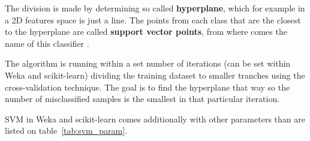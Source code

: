 The division is made by determining so called \textbf{hyperplane}, which for example in a 2D features space is just a line. The points from each class that are the closest to the hyperplane are called \textbf{support vector points}, from where comes the name of this classifier \cite{yadav_support_2018} \cite{noauthor_support_2014}. 

The algorithm is running within a set number of iterations (can be set within Weka and scikit-learn) dividing the training dataset to smaller tranches using the cross-validation technique. The goal is to find the hyperplane that way so the number of misclassified samples is the smallest in that particular iteration. 

SVM in Weka and scikit-learn comes additionally with other parameters than are listed on table~\ref{tab:svm_param}.

